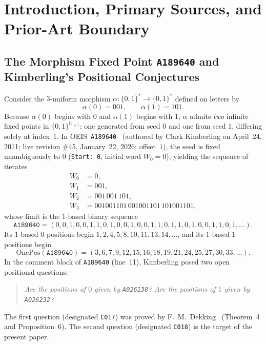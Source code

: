 \documentclass[11pt]{article}
\theoremstyle{definition}
\newcommand{\N}{\mathbb{N}}
\newcommand{\seq}[1]{\texttt{#1}}
\newcommand{\OnePos}{\mathrm{OnePos}}
\begin{document}
\section{Introduction, Primary Sources, and Prior-Art Boundary}

\subsection{The Morphism Fixed Point \seq{A189640} and Kimberling's Positional Conjectures}

Consider the $3$-uniform morphism $\alpha : \{0, 1\}^* \to \{0, 1\}^*$ defined on letters by
\begin{equation}
\label{eq:morph}
\alpha(0) = 001, \qquad \alpha(1) = 101.
\end{equation}
Because $\alpha(0)$ begins with $0$ and $\alpha(1)$ begins with $1$, $\alpha$ admits \emph{two} infinite fixed points in $\{0, 1\}^{\N_{\ge 1}}$: one generated from seed $0$ and one from seed $1$, differing solely at index~$1$. In OEIS~\seq{A189640}~\cite{oeis189640} (authored by Clark Kimberling on April~24, 2011; live revision \#45, January~22, 2026; offset~$1$), the seed is fixed unambiguously to $0$ (\texttt{Start: 0}, initial word $W_0 = 0$), yielding the sequence of iterates
\begin{align*}
W_0 &= 0, \\
W_1 &= 001, \\
W_2 &= 001\,001\,101, \\
W_3 &= 001001101\,001001101\,101001101,
\end{align*}
whose limit is the $1$-based binary sequence
\[
\seq{A189640} = (0, 0, 1, 0, 0, 1, 1, 0, 1, 0, 0, 1, 0, 0, 1, 1, 0, 1, 1, 0, 1, 0, 0, 1, 1, 0, 1, \dots).
\]
Its $1$-based $0$-positions begin $1, 2, 4, 5, 8, 10, 11, 13, 14, \dots$, and its $1$-based $1$-positions begin
\[
\OnePos(\seq{A189640}) = (3, 6, 7, 9, 12, 15, 16, 18, 19, 21, 24, 25, 27, 30, 33, \dots).
\]
In the comment block of \seq{A189640} (line~11), Kimberling posed two open positional questions:
\begin{quote}\itshape
Are the positions of $0$ given by \seq{A026138}? Are the positions of $1$ given by \seq{A026232}?
\end{quote}
The first question (designated \texttt{C017}) was proved by F.~M.\ Dekking~\cite{dekking2020} (Theorem~4 and Proposition~6). The second question (designated \texttt{C018}) is the target of the present paper.
\end{document}
